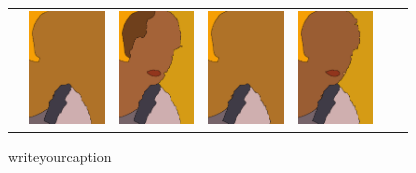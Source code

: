 \begin{figure}
\begin{center}
\begin{tabular}{ c  c  c  c  c  c  c }
&\includegraphics[width=2cm]{fig/visual_result/visual_result_6_4.png}
&\includegraphics[width=2cm]{fig/visual_result/visual_result_6_5.png}
&\includegraphics[width=2cm]{fig/visual_result/visual_result_6_6.png}
&\includegraphics[width=2cm]{fig/visual_result/visual_result_6_7.png}
\\
\end{tabular}
\end{center}
\caption{writeyourcaption}
\label{fig:visual_result}
\end{figure}
